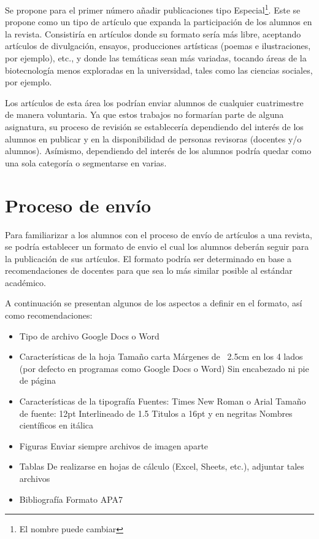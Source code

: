 \documentclass{Manual}
\begin{document}
Se propone para el primer número añadir publicaciones tipo Especial\footnote{El nombre puede cambiar}. Este se propone como un tipo de artículo que expanda la participación de los alumnos en la revista. Consistiría en artículos donde su formato sería más libre, aceptando artículos de divulgación, ensayos, producciones artísticas (poemas e ilustraciones, por ejemplo), etc., y donde las temáticas sean más variadas, tocando áreas de la biotecnología menos exploradas en la universidad, tales como las ciencias sociales, por ejemplo.

Los artículos de esta área los podrían enviar alumnos de cualquier cuatrimestre de manera voluntaria. Ya que estos trabajos no formarían parte de alguna asignatura, su proceso de revisión se establecería dependiendo del interés de los alumnos en publicar y en la disponibilidad de personas revisoras (docentes y/o alumnos). Asímismo, dependiendo del interés de los alumnos podría quedar como una sola categoría o segmentarse en varias.

\section{Proceso de envío}

Para familiarizar a los alumnos con el proceso de envío de artículos a una revista, se podría establecer un formato de envio el cual los alumnos deberán seguir para la publicación de sus artículos. El formato podría ser determinado en base a recomendaciones de docentes para que sea lo más similar posible al estándar académico.

A continuación se presentan algunos de los aspectos a definir en el formato, así como recomendaciones:

\begin{itemize}
    \item Tipo de archivo
        \subitem Google Docs o Word
    \item Características de la hoja
        \subitem Tamaño carta
        \subitem Márgenes de ~2.5cm en los 4 lados (por defecto en programas como Google Docs o Word)
        \subitem Sin encabezado ni pie de página
    \item Características de la tipografía
        \subitem Fuentes: Times New Roman o Arial
        \subitem Tamaño de fuente: 12pt
        \subitem Interlineado de 1.5
        \subitem Titulos a 16pt y en negritas
        \subitem Nombres científicos en itálica
    \item Figuras
        \subitem Enviar siempre archivos de imagen aparte
    \item Tablas
        \subitem De realizarse en hojas de cálculo (Excel, Sheets, etc.), adjuntar tales archivos
    \item Bibliografía
        \subitem Formato APA7
\end{itemize}
\end{document}
